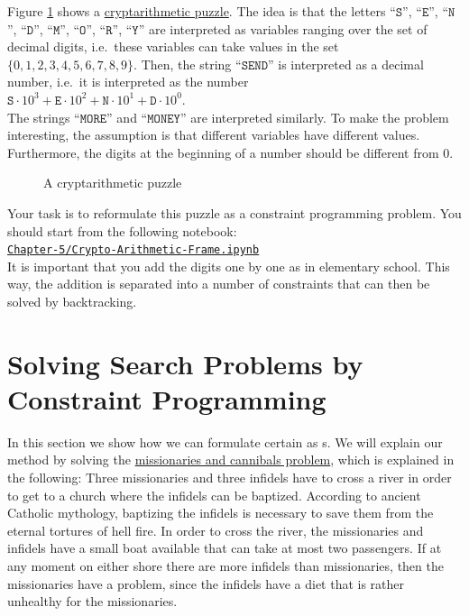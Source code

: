 \exerciseEng
Figure \ref{fig:send-more-money.pdf} shows a
\href{https://en.wikipedia.org/wiki/Verbal_arithmetic}{cryptarithmetic puzzle}.
The idea is that the letters 
``$\texttt{S}$'', ``$\texttt{E}$'', ``$\texttt{N}$'', ``$\texttt{D}$'', ``$\texttt{M}$'', ``$\texttt{O}$'', ``$\texttt{R}$'', ``$\texttt{Y}$'' 
are interpreted as variables ranging over the set of decimal digits, i.e.~these variables can take values in
the set $\{0,1,2,3,4,5,6,7,8,9\}$.  Then, the string ``$\texttt{SEND}$'' is interpreted as a decimal number,
i.e.~it is interpreted as the number
\\[0.2cm]
\hspace*{1.3cm}
$\texttt{S} \cdot 10^3 + \texttt{E} \cdot 10^2 + \texttt{N} \cdot 10^1 + \texttt{D} \cdot 10^0$.
\\[0.2cm]
The strings ``$\texttt{MORE}$'' and ``$\texttt{MONEY}$'' are interpreted similarly. To make the problem
interesting, the assumption is that different variables have different values.  Furthermore, the
digits at the beginning of a number should be different from $0$.


\begin{figure}[!ht]
\centering
{}

\caption{A cryptarithmetic puzzle}
\label{fig:send-more-money.pdf}
\end{figure}

Your task is to reformulate this puzzle as a constraint
programming problem.  You should start from the following notebook:
\\[0.2cm]
\hspace*{1.3cm}
\href{https://github.com/karlstroetmann/Logic/blob/master/Java/Chapter-5/Crypto-Arithmetic-Frame.ipynb}{\texttt{Chapter-5/Crypto-Arithmetic-Frame.ipynb}}
\\[0.2cm]
It is important that you add the digits one by one as in elementary school.  This way, the addition is
separated into a number of constraints that can then be solved by backtracking.  \eox

\section{Solving Search Problems by Constraint Programming}
In this section we show how we can formulate certain  as s.
We will explain our method by solving the
\href{https://flashmuseum.org/priests-n-devils/}{missionaries and cannibals problem},
which is explained in the following:
Three missionaries and three infidels have to cross a river in order to get to a church where the infidels can
be baptized.  According to ancient Catholic mythology, baptizing the infidels is necessary to save them from
the eternal tortures of hell fire. In order to cross the river, the missionaries and infidels have a small boat
available that can take at most two passengers. If at any moment on either shore there are more infidels than
missionaries, then the missionaries have a problem, since the infidels have a diet that is rather unhealthy for
the missionaries. 

